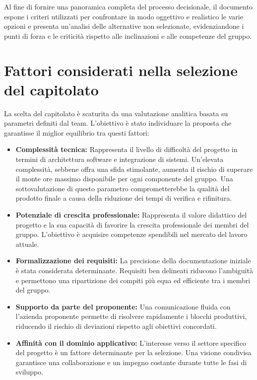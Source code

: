 \documentclass[a4paper, 10pt, colorlinks=true, linkcolor=black, urlcolor=blue, citecolor=blue, hidelinks]{article}
\begin{document}
Al fine di fornire una panoramica completa del processo decisionale, il documento espone i criteri utilizzati per confrontare in modo oggettivo e realistico le varie opzioni e presenta un'analisi delle alternative non selezionate, evidenziandone i punti di forza e le criticità rispetto alle inclinazioni e alle competenze del gruppo.

\section{Fattori considerati nella selezione del capitolato}

La scelta del capitolato è scaturita da una valutazione analitica basata su parametri definiti dal team. L'obiettivo è stato individuare la proposta che garantisse il miglior equilibrio tra questi fattori:

\begin{itemize}
\item \textbf{Complessità tecnica:} Rappresenta il livello di difficoltà del progetto in termini di architettura software e integrazione di sistemi. Un'elevata complessità, sebbene offra una sfida stimolante, aumenta il rischio di superare il monte ore massimo disponibile per ogni componente del gruppo. Una sottovalutazione di questo parametro comprometterebbe la qualità del prodotto finale a causa della riduzione dei tempi di verifica e rifinitura.

    \item \textbf{Potenziale di crescita professionale:} Rappresenta il valore didattico del progetto e la sua capacità di favorire la crescita professionale dei membri del gruppo. L'obiettivo è acquisire competenze spendibili nel mercato del lavoro attuale.
    
    \item \textbf{Formalizzazione dei requisiti:} La precisione della documentazione iniziale è stata considerata determinante. Requisiti ben delineati riducono l'ambiguità e permettono una ripartizione dei compiti più equa ed efficiente tra i membri del gruppo.

    \item \textbf{Supporto da parte del proponente:} Una comunicazione fluida con l'azienda proponente permette di risolvere rapidamente i blocchi produttivi, riducendo il rischio di deviazioni rispetto agli obiettivi concordati.
    
    \item \textbf{Affinità con il dominio applicativo:} L'interesse verso il settore specifico del progetto è un fattore determinante per la selezione. Una visione condivisa garantisce una collaborazione e un impegno costante durante tutte le fasi di sviluppo.
\end{itemize}
\end{document}
